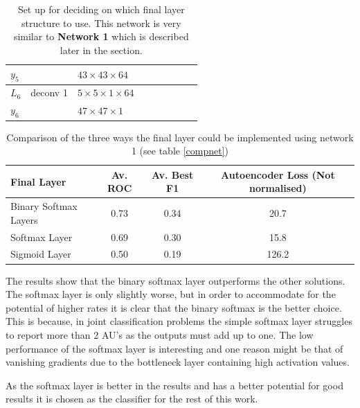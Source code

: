 \begin{table}[h!]
{\begin{tabular}{|lllllllll|}
    \multicolumn{1}{|l|}{$y_5$}   &          & \multicolumn{1}{l|}{$43\times43\times 64$}          &          & \multicolumn{1}{l|}{}          \\ \hline
    \multicolumn{1}{|l|}{$L_6$}   & deconv 1   & \multicolumn{1}{l|}{$5\times 5\times1\times 64$}  &          & \multicolumn{1}{l|}{}\\
    \multicolumn{1}{|l|}{$y_6$}   &          & \multicolumn{1}{l|}{$47\times47\times1$}            &          & \multicolumn{1}{l|}{}         \\ \hline
    \end{tabular}

    \caption{Set up for deciding on which final layer structure to use.
    This network is very similar to \textbf{Network 1} which is described later in the section.} \label{net:classcompnet}

    }
    \end{table}


    \begin{table}[!h] {\footnotesize
      \centering
      \begin{tabular}{lccc}
      \hline
      Final Layer   & Av. ROC &   Av. Best F1 &   Autoencoder Loss (Not normalised) \\
      \hline
      Binary Softmax Layers  &   0.73 &  0.34 &   20.7 \\
      Softmax Layer          &   0.69 &  0.30 &   15.8 \\
      Sigmoid Layer          &   0.50 &  0.19 &  126.2 \\
      \hline
      \end{tabular}
    \caption{Comparison of the three ways the final layer could be implemented using network 1 (see table \ref{compnet})} \label{net:classcompnet} }
    \end{table}

    The results show that the binary softmax layer outperforms the other solutions. The
    softmax layer is only slightly worse, but in order to accommodate for the potential of higher rates
    it is clear that the binary softmax is the better choice. This is because, in joint classification problems
    the simple softmax layer struggles to report more than 2 AU's as the outputs must add up to one.
    The low performance of the softmax layer is interesting and one reason might be that of vanishing gradients due to
    the bottleneck layer containing high activation values.

    As the softmax layer is better in the results and has a better potential for good results
    it is chosen as the classifier for the rest of this work.

